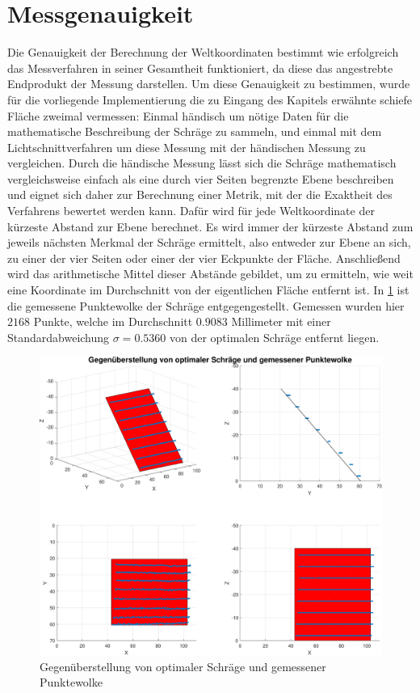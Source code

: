 \section{Messgenauigkeit}
Die Genauigkeit der Berechnung der Weltkoordinaten bestimmt wie erfolgreich das Messverfahren in seiner Gesamtheit funktioniert, da diese das angestrebte Endprodukt der Messung darstellen. Um diese Genauigkeit zu bestimmen, wurde für die vorliegende Implementierung die zu Eingang des Kapitels erwähnte schiefe Fläche zweimal vermessen: Einmal händisch um nötige Daten für die mathematische Beschreibung der Schräge zu sammeln, und einmal mit dem Lichtschnittverfahren um diese Messung mit der händischen Messung zu vergleichen. Durch die händische Messung lässt sich die Schräge mathematisch vergleichsweise einfach als eine durch vier Seiten begrenzte Ebene beschreiben und eignet sich daher zur Berechnung einer Metrik, mit der die Exaktheit des Verfahrens bewertet werden kann. Dafür wird für jede Weltkoordinate der kürzeste Abstand zur Ebene berechnet. Es wird immer der kürzeste Abstand zum jeweils nächsten Merkmal der Schräge ermittelt, also entweder zur Ebene an sich, zu einer der vier Seiten oder einer der vier Eckpunkte der Fläche. Anschließend wird das arithmetische Mittel dieser Abstände gebildet, um zu ermitteln, wie weit eine Koordinate im Durchschnitt von der eigentlichen Fläche entfernt ist. \linebreak
In \ref{fig:MessungSlope} ist die gemessene Punktewolke der Schräge entgegengestellt. Gemessen wurden hier \(2168\) Punkte, welche im Durchschnitt \(0.9083\) Millimeter mit einer Standardabweichung \(\sigma = 0.5360\) von  der optimalen Schräge entfernt liegen. \bigbreak

\begin{figure}
\centering \includegraphics[width=\textwidth]{images/MessungBig.pdf}
\caption[Gegenüberstellung von optimaler Schräge und gemessener Punktewolke]{Gegenüberstellung von optimaler Schräge und gemessener Punktewolke}\label{fig:MessungSlope}
\end{figure}

